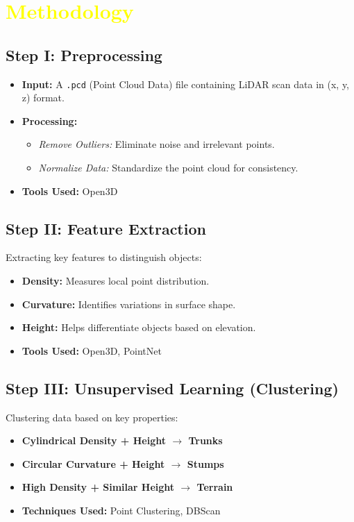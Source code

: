 \documentclass[../report.tex]{subfiles}
\begin{document}
    \section{\textcolor{yellow}{Methodology}}
    \label{sec:methodology}
    \subsection{Step I: Preprocessing}
\begin{itemize}
    \item \textbf{Input:} A \texttt{.pcd} (Point Cloud Data) file containing LiDAR scan data in (x, y, z) format.
    \item \textbf{Processing:}
    \begin{itemize}
        \item \textit{Remove Outliers:} Eliminate noise and irrelevant points.
        \item \textit{Normalize Data:} Standardize the point cloud for consistency.
    \end{itemize}
    \item \textbf{Tools Used:} Open3D
\end{itemize}

\subsection{Step II: Feature Extraction}
Extracting key features to distinguish objects:
\begin{itemize}
    \item \textbf{Density:} Measures local point distribution.
    \item \textbf{Curvature:} Identifies variations in surface shape.
    \item \textbf{Height:} Helps differentiate objects based on elevation.
    \item \textbf{Tools Used:} Open3D, PointNet
\end{itemize}

\subsection{Step III: Unsupervised Learning (Clustering)}
Clustering data based on key properties:
\begin{itemize}
    \item \textbf{Cylindrical Density + Height $\rightarrow$ Trunks}
    \item \textbf{Circular Curvature + Height $\rightarrow$ Stumps}
    \item \textbf{High Density + Similar Height $\rightarrow$ Terrain}
    \item \textbf{Techniques Used:} Point Clustering, DBScan
\end{itemize}
\end{document}
